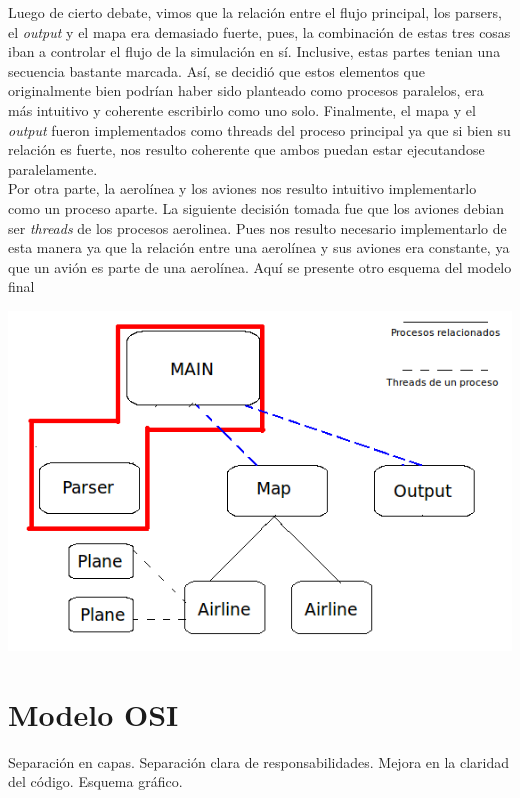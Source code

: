 \documentclass[a4paper,10pt]{article}
\begin{document}
 Luego de cierto debate, vimos que la relación entre el flujo principal, los parsers, el \textit{output} y el mapa era demasiado fuerte, pues, 
 la combinación de estas tres cosas iban a 
 controlar el flujo de la simulación en sí. Inclusive, estas partes tenian una secuencia bastante marcada. Así, se decidió que estos elementos que originalmente bien podrían haber 
 sido planteado como procesos paralelos, era más intuitivo y coherente escribirlo como uno solo.
 Finalmente, el mapa y el \textit{output} fueron implementados como threads del proceso principal ya que si bien su relación es fuerte, nos resulto coherente
  que ambos puedan estar ejecutandose paralelamente. \\

Por otra parte, la aerolínea y los aviones nos resulto intuitivo implementarlo como un proceso aparte. La siguiente decisión tomada fue que los aviones debian ser \textit{threads}
 de los procesos aerolinea. Pues nos resulto necesario implementarlo de esta manera ya que la relación entre una aerolínea y sus aviones era constante, ya que un avión es parte
  de una aerolínea. Aquí se presente otro esquema del modelo final\\

\begin{center}
 \includegraphics{./images/Diagrama_simulacion_1.png}
\end{center}


\newpage
\section{Modelo OSI}
Separación en capas. Separación clara de responsabilidades. Mejora en la claridad del código.
Esquema gráfico.
\end{document}
